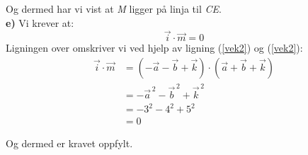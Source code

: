 \documentclass[english, 11 pt]{report}
\begin{document}
Og dermed har vi vist at \textit{M} ligger på linja til \textit{CE}. \\

\textbf{e)} Vi krever at: 
\[  \vec i \cdot \vec m=0 \]
Ligningen over omskriver vi ved hjelp av ligning (\ref{vek2}) og (\ref{vek2}):
\begin{align*}
\overrightarrow{i}\cdot \vec m &= \left(-\vec a -\vec b + \vec k\right)\cdot   \left(\vec{a} + \vec b + \vec k\right) \\
&= -\vec{a}^{\,2} -\vec{b}^{\,2} +\vec{k}^{\,2} \\
& = -3^2-4^2 + 5^2 \\
& = 0
\end{align*}

Og dermed er kravet oppfylt.
\end{document}
